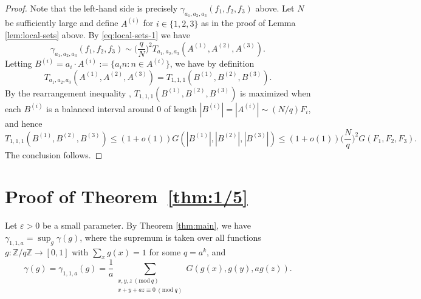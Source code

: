 \documentclass[12pt, notitlepage]{amsart}
\numberwithin{equation}{section}
\def\Z{\mathbb Z}
\newcommand{\eps}{\varepsilon}
\newcommand{\Mod}[1]{\ (\mathrm{mod}\ #1)}
\theoremstyle{remark}
\theoremstyle{definition}
\theoremstyle{remark}
\numberwithin{equation}{section}
\begin{document}
\begin{proof}
Note that the left-hand side is precisely $\gamma_{a_1,a_2,a_3}(f_1,f_2,f_3)$ above. Let $N$ be sufficiently large and define $A^{(i)}$ for $i \in \{1,2,3\}$ as in the proof of Lemma \ref{lem:local-sets} above. By \eqref{eq:local-sets-1} we have
$$
\gamma_{a_1,a_2,a_3}(f_1,f_2,f_3) \sim \Big(\frac{q}{N}\Big)^2 T_{a_1,a_2,a_3}(A^{(1)}, A^{(2)}, A^{(3)}).
$$
Letting $B^{(i)} = a_i \cdot A^{(i)} := \{a_in : n \in A^{(i)}\}$, we have by definition
$$
 T_{a_1,a_2,a_3}(A^{(1)}, A^{(2)}, A^{(3)}) =  T_{1,1,1}(B^{(1)}, B^{(2)}, B^{(3)}).
$$
By the rearrangement inequality \cite[Theorem 1]{lev1998number}, $T_{1,1,1}(B^{(1)},B^{(2)},B^{(3)})$ is maximized when each $B^{(i)}$ is a balanced interval around $0$ of length $|B^{(i)}| = |A^{(i)}| \sim (N/q) F_i$, and hence
$$
T_{1,1,1}(B^{(1)}, B^{(2)}, B^{(3)}) \leq (1+o(1)) G(|B^{(1)}|, |B^{(2)}|, |B^{(3)}|) \leq (1+o(1)) \Big(\frac{N}{q}\Big)^2 G(F_1, F_2, F_3).
$$
The conclusion follows.
\end{proof}

\section{Proof of Theorem~\ref{thm:1/5}}\label{sec:1/5}

Let $\eps > 0$ be a small parameter. By Theorem \ref{thm:main}, we have $\gamma_{1,1,a} = \sup_g \gamma(g)$, where the supremum is taken over all functions $g: \Z/q\Z \rightarrow [0,1]$ with $\sum_x g(x) = 1$ for some $q = a^k$, and
$$
\gamma(g) = \gamma_{1,1,a}(g) = \frac{1}{a} \sum_{\substack{x,y,z\Mod{q}\\ x+y+az\equiv 0\Mod{q}}} G(g(x), g(y), ag(z)).
$$
\end{document}

